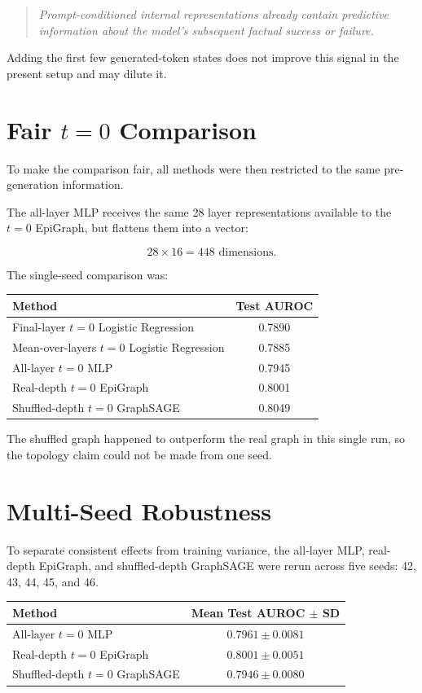 \documentclass[11pt]{article}
\begin{document}
\begin{quote}
\textit{Prompt-conditioned internal representations already contain predictive information about the model's subsequent factual success or failure.}
\end{quote}

Adding the first few generated-token states does not improve this signal in the present setup and may dilute it.

\section{Fair \(t=0\) Comparison}

To make the comparison fair, all methods were then restricted to the same pre-generation information.

The all-layer MLP receives the same 28 layer representations available to the \(t=0\) EpiGraph, but flattens them into a vector:

\[
28 \times 16 = 448 \text{ dimensions}.
\]

The single-seed comparison was:

\begin{center}
\begin{tabular}{lc}
\toprule
Method & Test AUROC \\
\midrule
Final-layer \(t=0\) Logistic Regression & 0.7890 \\
Mean-over-layers \(t=0\) Logistic Regression & 0.7885 \\
All-layer \(t=0\) MLP & 0.7945 \\
Real-depth \(t=0\) EpiGraph & 0.8001 \\
Shuffled-depth \(t=0\) GraphSAGE & 0.8049 \\
\bottomrule
\end{tabular}
\end{center}

The shuffled graph happened to outperform the real graph in this single run, so the topology claim could not be made from one seed.

\section{Multi-Seed Robustness}

To separate consistent effects from training variance, the all-layer MLP, real-depth EpiGraph, and shuffled-depth GraphSAGE were rerun across five seeds: 42, 43, 44, 45, and 46.

\begin{center}
\begin{tabular}{lc}
\toprule
Method & Mean Test AUROC \(\pm\) SD \\
\midrule
All-layer \(t=0\) MLP & \(0.7961 \pm 0.0081\) \\
Real-depth \(t=0\) EpiGraph & \(\mathbf{0.8001 \pm 0.0051}\) \\
Shuffled-depth \(t=0\) GraphSAGE & \(0.7946 \pm 0.0080\) \\
\bottomrule
\end{tabular}
\end{center}
\end{document}
